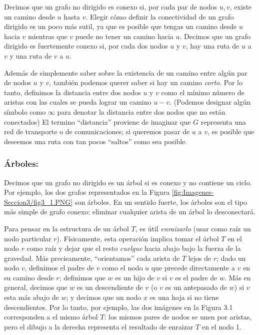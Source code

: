 \documentclass[a4paper, 12pt]{book}
\theoremstyle{dotless}
\begin{document}
Decimos que un grafo no dirigido es conexo si, por cada par de nodos $u,v$, existe un camino desde $u$ hasta $v$. 
Elegir cómo definir la conectividad de un grafo dirigido es un poco más sutil, ya que es posible que tengas un camino desde $u$ hacia $v$ mientras que $v$ puede no tener un camino hacia $u$. 
Decimos que un grafo dirigido es fuertemente conexo si, por cada dos nodos $u$ y $v$, hay una ruta de $u$ a $v$ y una ruta de $v$ a $u$.

Además de simplemente saber sobre la existencia de un camino entre algún par de nodos $u$ y $v$, también podemos querer saber si hay un camino \textit{corto}.
Por lo tanto, definimos la distancia entre dos nodos $u$ y $v$ como el mínimo número de aristas con las cuales se pueda lograr un camino $u-v$.
(Podemos designar algún símbolo como $\infty$ para denotar la distancia entre dos nodos que no están conectados)
El termino ``distancia'' proviene de imaginar que $G$ representa una red de transporte o de comunicaciones; si queremos pasar de $u$ a $v$, es posible que deseemos una ruta con tan pocos ``saltos'' como sea posible.


\subsubsection{Árboles:} Decimos que un grafo no dirigido es un árbol si es conexo y no contiene un ciclo. Por ejemplo, los dos grafos representados en la Figura \ref{fig:Imagenes-Seccion3/fig3_1.PNG} son árboles. En un sentido fuerte, los árboles son el tipo más simple de grafo conexo: eliminar cualquier arista de un árbol lo desconectará. 

Para pensar en la estructura de un árbol $T$, es útil \textit{enraizarlo} (usar como raíz un nodo particular $r$). 
Físicamente, esta operación implica tomar el árbol $T$ en el nodo $r$ como raíz y dejar que el resto \textit{cuelgue} hacia abajo bajo la fuerza de la gravedad. Más precisamente, ``orientamos'' cada arista de $T$ lejos de $r$;  dado un nodo $v$, definimos el padre de $v$ como el nodo $u$ que precede directamente a $v$ en su camino desde $r$; definimos que $w$ es un hijo de $v$ si $v$ es el padre de $w$. Más
en general, decimos que $w$ es un descendiente de $v$ (o $v$ es un antepasado de $w$) si $v$ esta más abajo de $w$; y decimos que un nodo $x$ es una hoja si no tiene
descendientes. Por lo tanto, por ejemplo, las dos imágenes en la Figura 3.1 corresponden a el mismo árbol $T$: los mismos pares de nodos se unen por aristas, pero el dibujo a la derecha representa el resultado de enraizar $T$ en el nodo 1.\\
\end{document}

